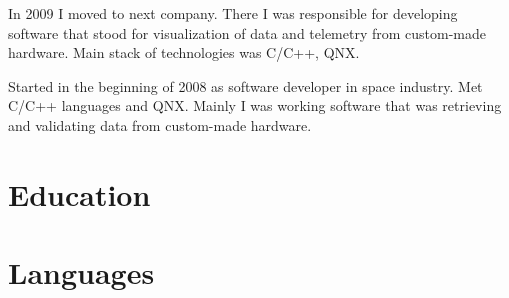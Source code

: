 \documentclass[11pt, a4paper]{moderncv}
\begin{document}
{
In 2009 I moved to next company. 
There I was responsible for developing software that stood for visualization of data and telemetry from custom-made hardware. 
Main stack of technologies was C/C++, QNX.
}

{
Started in the beginning of 2008 as software developer in space industry. 
Met C/C++ languages and QNX. 
Mainly I was working software that was retrieving and validating data from custom-made hardware.
}

\section{Education}

 
\section{Languages}
 
\end{document}
